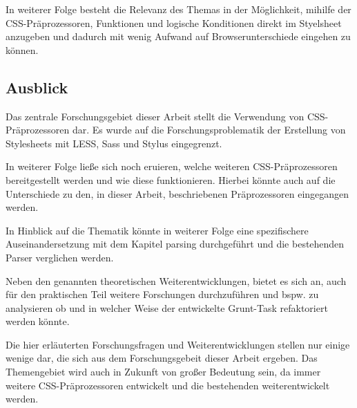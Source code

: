 In weiterer Folge besteht die Relevanz des Themas in der Möglichkeit, mihilfe der CSS-Präprozessoren, Funktionen und logische Konditionen direkt im Styelsheet anzugeben und dadurch mit wenig Aufwand auf Browserunterschiede eingehen zu können.
\subsection{Ausblick}
Das zentrale Forschungsgebiet dieser Arbeit stellt die Verwendung von CSS-Präprozessoren dar. Es wurde auf die Forschungsproblematik der Erstellung von Stylesheets mit LESS, Sass und Stylus eingegrenzt.

In weiterer Folge ließe sich noch eruieren, welche weiteren CSS-Präprozessoren bereitgestellt werden und wie diese funktionieren. Hierbei könnte auch auf die Unterschiede zu den, in dieser Arbeit, beschriebenen Präprozessoren eingegangen werden.

In Hinblick auf die Thematik könnte in weiterer Folge eine spezifischere Auseinandersetzung mit dem Kapitel \glqq{}parsing\grqq{} durchgeführt und die bestehenden Parser verglichen werden.

Neben den genannten theoretischen Weiterentwicklungen, bietet es sich an, auch für den praktischen Teil weitere Forschungen durchzuführen und bspw. zu analysieren ob und in welcher Weise der entwickelte Grunt-Task refaktoriert werden könnte.

Die hier erläuterten Forschungsfragen und Weiterentwicklungen stellen nur einige wenige dar, die sich aus dem Forschungsgebeit dieser Arbeit ergeben. Das Themengebiet wird auch in Zukunft von großer Bedeutung sein, da immer weitere CSS-Präprozessoren entwickelt und die bestehenden weiterentwickelt werden.




